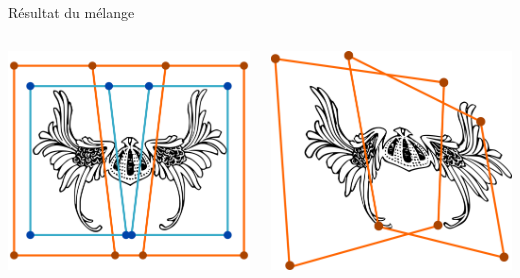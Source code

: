 \documentclass[xcolor=x11names,compress]{beamer}
\renewcommand{\(}{\begin{columns}} \renewcommand{\)}{\end{columns}}
\newcommand{\<}[1]{\begin{column}{#1}} \renewcommand{\>}{\end{column}}
\begin{document}
\begin{frame}{Résultat du mélange}
  \begin{columns}[t]
    \begin{column}{0.5\textwidth}
      \centering
      \includegraphics[scale=0.15]{Deformation-Viking-Melange-Avant}
    \end{column}
    \begin{column}{0.5\textwidth}
      \centering
      \includegraphics[scale=0.15]{Deformation-Viking-Melange-Apres}
    \end{column}
  \end{columns}
\end{frame}
\end{document}
